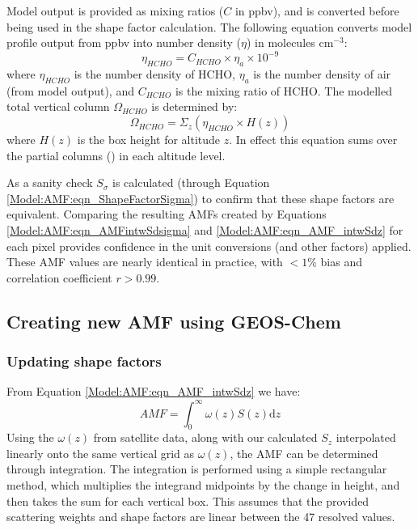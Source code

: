     Model output is provided as mixing ratios ($C$ in ppbv), and is converted before being used in the shape factor calculation.
    The following equation converts model profile output from ppbv into number density ($\eta$) in molecules cm$^{-3}$:
    \begin{equation} \label{Model:omiRecalc:eqn_ppb_to_n}
      \eta_{HCHO} = C_{HCHO} \times \eta_a \times 10^{-9}
    \end{equation}
    where $\eta_{HCHO}$ is the number density of HCHO, $\eta_a$ is the number density of air (from model output), and $C_{HCHO}$ is the mixing ratio of HCHO.
    The modelled total vertical column $\Omega_{HCHO}$ is determined by:
    \begin{equation*}
      \Omega_{HCHO} = \Sigma_z \left( \eta_{HCHO} \times H(z) \right)
    \end{equation*}
    where $H(z)$ is the box height for altitude $z$.
    In effect this equation sums over the partial columns (\moleccm) in each altitude level.
    
    As a sanity check $S_\sigma$ is calculated (through Equation \ref{Model:AMF:eqn_ShapeFactorSigma}) to confirm that these shape factors are equivalent.
    Comparing the resulting AMFs created by Equations \ref{Model:AMF:eqn_AMFintwSdsigma} and \ref{Model:AMF:eqn_AMF_intwSdz} for each pixel provides confidence in the unit conversions (and other factors) applied.
    These AMF values are nearly identical in practice, with $< 1\%$ bias and correlation coefficient $r > 0.99$.
    

  \subsection{Creating new AMF using GEOS-Chem}
    \label{Model:omiRecalc:AMF}
    
    \subsubsection{Updating shape factors}
    
      From Equation \ref{Model:AMF:eqn_AMF_intwSdz} we have:
      $$ AMF = \int_0^\infty \omega(z) S(z) \mathrm{d}z $$
      Using the $\omega(z)$ from satellite data, along with our calculated $S_z$ interpolated linearly onto the same vertical grid as $\omega(z)$, the AMF can be determined through integration.
      The integration is performed using a simple rectangular method, which multiplies the integrand midpoints by the change in height, and then takes the sum for each vertical box.
      This assumes that the provided scattering weights and shape factors are linear between the 47 resolved values.
    
